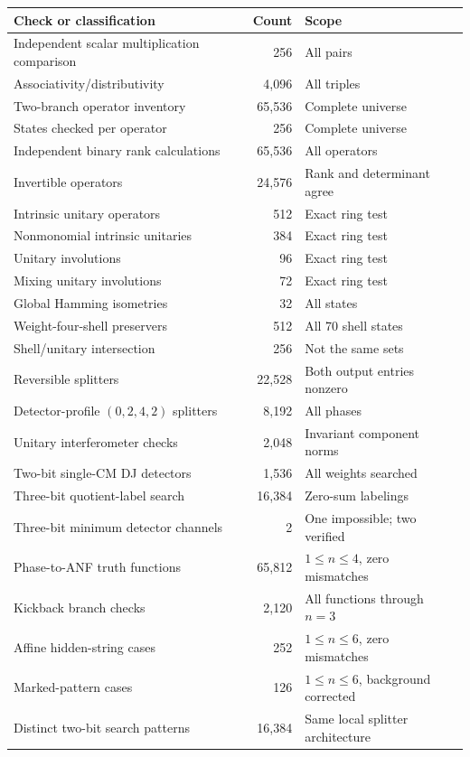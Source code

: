 \begin{longtable}{@{}L{0.48\textwidth}rL{0.31\textwidth}@{}}
\toprule Check or classification & Count & Scope\\\midrule\endhead
Independent scalar multiplication comparison & 256 & All pairs\\
Associativity/distributivity & 4,096 & All triples\\
Two-branch operator inventory & 65,536 & Complete universe\\
States checked per operator & 256 & Complete universe\\
Independent binary rank calculations & 65,536 & All operators\\
Invertible operators & 24,576 & Rank and determinant agree\\
Intrinsic unitary operators & 512 & Exact ring test\\
Nonmonomial intrinsic unitaries & 384 & Exact ring test\\
Unitary involutions & 96 & Exact ring test\\
Mixing unitary involutions & 72 & Exact ring test\\
Global Hamming isometries & 32 & All states\\
Weight-four-shell preservers & 512 & All 70 shell states\\
Shell/unitary intersection & 256 & Not the same sets\\
Reversible splitters & 22,528 & Both output entries nonzero\\
Detector-profile $(0,2,4,2)$ splitters & 8,192 & All phases\\
Unitary interferometer checks & 2,048 & Invariant component norms\\
Two-bit single-CM DJ detectors & 1,536 & All weights searched\\
Three-bit quotient-label search & 16,384 & Zero-sum labelings\\
Three-bit minimum detector channels & 2 & One impossible; two verified\\
Phase-to-ANF truth functions & 65,812 & $1\le n\le4$, zero mismatches\\
Kickback branch checks & 2,120 & All functions through $n=3$\\
Affine hidden-string cases & 252 & $1\le n\le6$, zero mismatches\\
Marked-pattern cases & 126 & $1\le n\le6$, background corrected\\
Distinct two-bit search patterns & 16,384 & Same local splitter architecture\\

\end{longtable}
